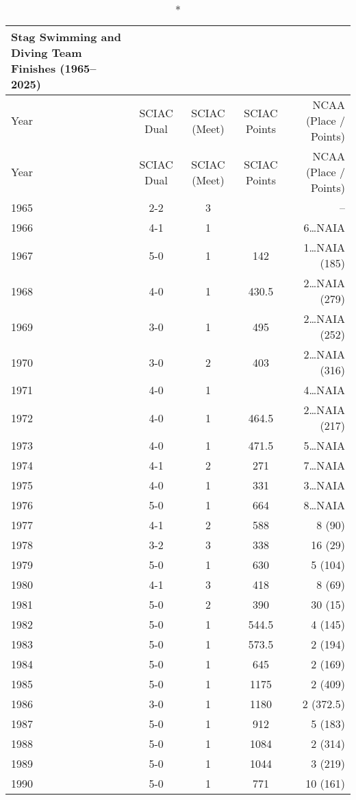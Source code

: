 \clearpage
\begin{longtable}{lcccr}
\caption*{Stag Swimming and Diving Team Finishes (1965–2025)} \\
\toprule
Year & SCIAC Dual & SCIAC (Meet) & SCIAC Points & NCAA (Place / Points) \\
\midrule
\endfirsthead

\toprule
Year & SCIAC Dual & SCIAC (Meet) & SCIAC Points & NCAA (Place / Points) \\
\midrule
\endhead

\bottomrule
\endfoot


1965 & 2-2 & 3 &   & -- \\
1966 & 4-1 & 1 &   & 6\ldots NAIA \\
1967 & 5-0 & 1 & 142 & 1\ldots NAIA (185) \\
1968 & 4-0 & 1 & 430.5 & 2\ldots NAIA (279) \\
1969 & 3-0 & 1 & 495 & 2\ldots NAIA (252) \\
1970 & 3-0 & 2 & 403 & 2\ldots NAIA (316) \\
1971 & 4-0 & 1 &   & 4\ldots NAIA \\
1972 & 4-0 & 1 & 464.5 & 2\ldots NAIA (217) \\
1973 & 4-0 & 1 & 471.5 & 5\ldots NAIA \\
1974 & 4-1 & 2 & 271 & 7\ldots NAIA \\
1975 & 4-0 & 1 & 331 & 3\ldots NAIA \\
1976 & 5-0 & 1 & 664 & 8\ldots NAIA \\
1977 & 4-1 & 2 & 588 & 8 (90) \\
1978 & 3-2 & 3 & 338 & 16 (29) \\
1979 & 5-0 & 1 & 630 & 5 (104) \\
1980 & 4-1 & 3 & 418 & 8 (69) \\
1981 & 5-0 & 2 & 390 & 30 (15) \\
1982 & 5-0 & 1 & 544.5 & 4 (145) \\
1983 & 5-0 & 1 & 573.5 & 2 (194) \\
1984 & 5-0 & 1 & 645 & 2 (169) \\
1985 & 5-0 & 1 & 1175 & 2 (409) \\
1986 & 3-0 & 1 & 1180 & 2 (372.5) \\
1987 & 5-0 & 1 & 912 & 5 (183) \\
1988 & 5-0 & 1 & 1084 & 2 (314) \\
1989 & 5-0 & 1 & 1044 & 3 (219) \\
1990 & 5-0 & 1 & 771 & 10 (161) \\

\end{longtable}
